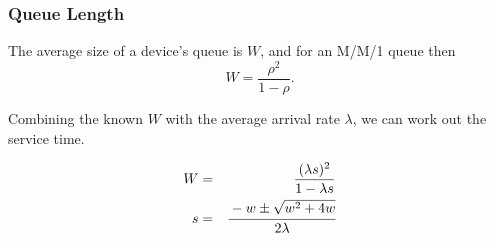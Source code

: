 \begin{frame}
\frametitle{Queue Length}

\begin{changemargin}{0.8cm}
\large 

The average size of a device's queue is $W$, and for an M/M/1 queue then 
\[ W = \dfrac{\rho^{2}}{1-\rho}.\]

Combining the known $W$ with the average arrival rate $\lambda$, we can work out the service time. 

\begin{eqnarray*}
W &=& \dfrac{(\lambda s)^{2}}{1 - \lambda s}\\
s &=& \cfrac{-w \pm \sqrt{w^{2}+4w}}{2\lambda}\\
\end{eqnarray*}
\end{changemargin}



\end{frame}




